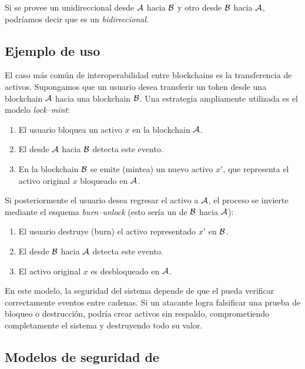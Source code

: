 Si se provee un \Bridge unidireccional desde $\mathcal{A}$ hacia $\mathcal{B}$ y otro desde $\mathcal{B}$ hacia $\mathcal{A}$, podríamos decir que es un \textit{\Bridge bidireccional}.

\subsection{Ejemplo de uso}
\label{subsec:bridges-ejemplo-de-uso}

El caso más común de interoperabilidad entre blockchains es la transferencia de activos. Supongamos que un usuario desea transferir un token desde una blockchain $\mathcal{A}$ hacia una blockchain $\mathcal{B}$. Una estrategia ampliamente utilizada es el modelo \emph{lock–mint}:

\begin{enumerate}[noitemsep]
	\item El usuario bloquea un activo $x$ en la blockchain $\mathcal{A}$.
	\item El \Bridge desde $\mathcal{A}$ hacia $\mathcal{B}$ detecta este evento.
	\item En la blockchain $\mathcal{B}$ se emite (mintea) un nuevo activo $x'$, que representa el activo original $x$ bloqueado en $\mathcal{A}$.
\end{enumerate}

Si posteriormente el usuario desea regresar el activo a $\mathcal{A}$, el proceso se invierte mediante el esquema \emph{burn–unlock} (esto sería un \Bridge de $\mathcal{B}$ hacia $\mathcal{A}$):

\begin{enumerate}[noitemsep]
	\item El usuario destruye (burn) el activo representado $x'$ en $\mathcal{B}$.
	\item El \Bridge desde $\mathcal{B}$ hacia $\mathcal{A}$ detecta este evento.
	\item El activo original $x$ es desbloqueado en $\mathcal{A}$.
\end{enumerate}

En este modelo, la seguridad del sistema depende de que el \Bridge pueda verificar correctamente eventos entre cadenas. Si un atacante logra falsificar una prueba de bloqueo o destrucción, podría crear activos sin respaldo, comprometiendo completamente el sistema y destruyendo todo su valor.

\subsection{Modelos de seguridad de \Bridges}
\label{subsec:bridges-modelos-de-seguridad-de-bridges}

